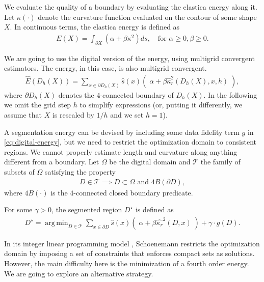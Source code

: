 \documentclass[runningheads]{llncs}
\DeclareMathOperator*{\argmin}{arg\,min}
\begin{document}
We evaluate the quality of a boundary by evaluating the elastica energy along it. Let $\kappa (\cdot)$ denote the curvature function evaluated on the contour of some shape $X$. In continuous terms, the elastica energy is defined as 
\begin{align*}
  E(X) = \int_{\partial X}{(\alpha + \beta \kappa^2) ds}, \quad \text{for~} \alpha \ge 0, \beta \ge 0.
\end{align*}

We are going to use the digital version of the energy, using multigrid convergent estimators. The energy, in this case, is also multigrid convergent.
\begin{align}
	\hat{E}( D_h(X) ) = \sum_{x \in \partial D_h(X)}{ \hat{s}(x)\left(\; \alpha + \beta \hat{\kappa}_{r}^2(D_h(X),x,h) \; \right)}, 
	\label{eq:digital-energy}
\end{align}
where $\partial D_h(X)$ denotes the $4$-connected boundary of $D_h(X)$. In the following we omit the grid step $h$ to simplify expressions (or, putting it differently, we assume that $X$ is rescaled by $1/h$ and we set $h=1$).

A segmentation energy can be devised by including some data fidelity term $g$ in \eqref{eq:digital-energy}, but we need to restrict the optimization domain to consistent regions. We cannot properly estimate length and curvature along anything different from a boundary. Let $\Omega$ be the digital domain and $\mathcal{T}$ the family of subsets of $\Omega$ satisfying the property
\begin{align*}
	D \in \mathcal{T} \implies D \subset \Omega \text{ and } 4B(\partial D),
\end{align*} 
where $4B(\cdot)$ is the $4$-connected closed boundary predicate. 


For some $\gamma>0$, the segmented region $D^\star$ is defined as
\begin{align}
	D^{\star} = \argmin_{D \in \mathcal{T}}{\sum_{x \in \partial D}{ \hat{s}(x)\left(\; \alpha + \beta \hat{\kappa_{r}}^2(D,x) \; \right)} + \gamma \cdot g(D).}
	\label{eq:ideal_optimization_energy}
\end{align}

In its integer linear programming model \cite{schoenemann09}, Schoenemann restricts the optimization domain by imposing a set of constraints that enforces compact sets as solutions. However, the main difficulty here is the minimization of a fourth order energy. We are going to explore an alternative strategy.
\end{document}
